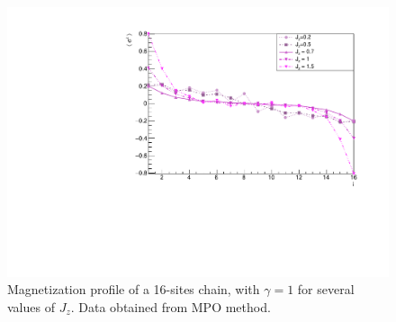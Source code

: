 





\begin{figure}[H]
    \centering
    \includegraphics[scale=0.7]{Figures/16sites/16sites_LMvsJz.pdf}
    \captionsetup{width=1.\linewidth}
    \caption{Magnetization profile of a 16-sites chain, with $\gamma = 1$ for several values of $J_z$. Data obtained from MPO method.}
    \label{fig:16sites_LMvsJz}
\end{figure}

